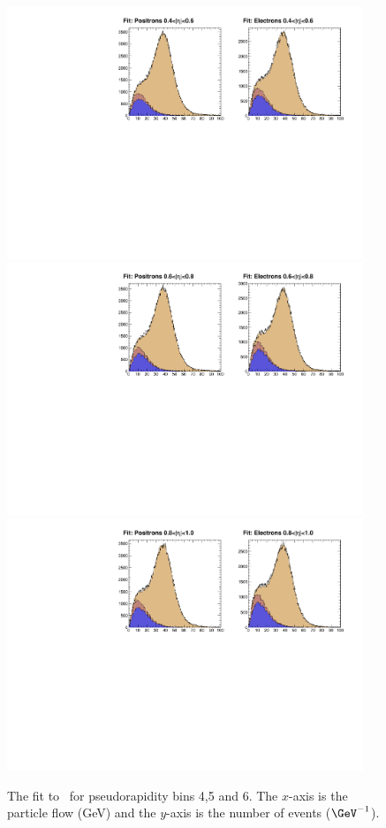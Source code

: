 \begin{figure}
\begin{center}
\includegraphics[width=0.95\textwidth]{data_2.pdf}
\includegraphics[width=0.95\textwidth]{data_3.pdf} \\
\includegraphics[width=0.95\textwidth]{data_4.pdf} \\
\caption[The fit to \MET for pseudorapidity bins 3,4 and 5.]
{\label{fig:data2} The fit to \MET\ for pseudorapidity bins 4,5 and
6.  The $x$-axis is the particle flow \ETm (GeV) and the $y$-axis is the number
of events ($\GeV^{-1}$).}
\end{center}
\end{figure}

